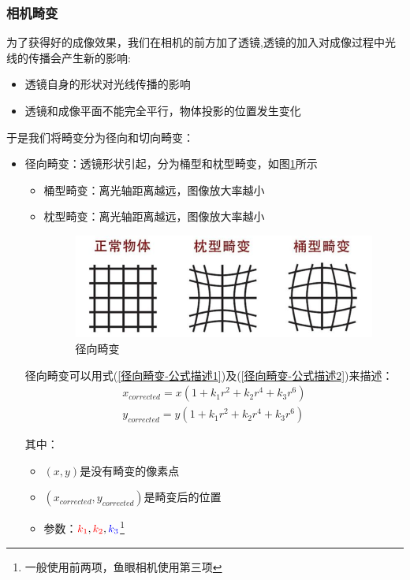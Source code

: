\documentclass{article}
\begin{document}
\subsubsection{相机畸变}
为了获得好的成像效果，我们在相机的前方加了透镜,透镜的加入对成像过程中光线的传播会产生新的影响:
\begin{itemize}
	\item 透镜自身的形状对光线传播的影响
	\item 透镜和成像平面不能完全平行，物体投影的位置发生变化
\end{itemize}

于是我们将畸变分为径向和切向畸变：
\begin{itemize}
	\item 径向畸变：透镜形状引起，分为桶型和枕型畸变，如图\ref{径向畸变}所示
	\begin{itemize}
		\item 桶型畸变：离光轴距离越远，图像放大率越小
		\item 枕型畸变：离光轴距离越远，图像放大率越小
		\begin{figure}[H]
		\begin{center}
			\includegraphics[scale = 0.35]{畸变失真}
			\caption{径向畸变}
			\label{径向畸变}
		\end{center}
		\end{figure}
	\end{itemize}

径向畸变可以用式(\ref{径向畸变-公式描述1})及(\ref{径向畸变-公式描述2})来描述：
\begin{gather}
	x_{corrected}=x\left( 1+k_1r^2+k_2r^4+k_3r^6 \right) \label{径向畸变-公式描述1}
	\\
	y_{corrected}=y\left( 1+k_1r^2+k_2r^4+k_3r^6 \right) \label{径向畸变-公式描述2}	
\end{gather}

其中：
	\begin{itemize}
	\item $(x,y)$是没有畸变的像素点
	\item $(x_{corrected},y_{corrected})$是畸变后的位置
	\item 参数：${\color{red} k_1},{\color{red} k_2},{\color{blue} k_3}$\footnote{一般使用前两项，鱼眼相机使用第三项}
\end{itemize}


\end{itemize}
\end{document}
